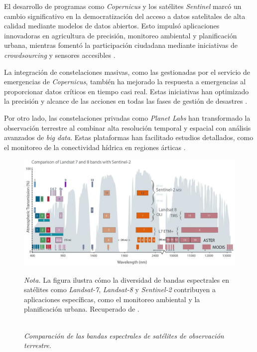         El desarrollo de programas como \textit{Copernicus} y los satélites \textit{Sentinel} marcó un cambio significativo en la democratización del acceso a datos satelitales de alta calidad mediante modelos de datos abiertos. Esto impulsó aplicaciones innovadoras en agricultura de precisión, monitoreo ambiental y planificación urbana, mientras fomentó la participación ciudadana mediante iniciativas de \textit{crowdsourcing} y sensores accesibles \autocite{karagiannopoulou2022data}.

        La integración de constelaciones masivas, como las gestionadas por el servicio de emergencias de \textit{Copernicus}, también ha mejorado la respuesta a emergencias al proporcionar datos críticos en tiempo casi real. Estas iniciativas han optimizado la precisión y alcance de las acciones en todas las fases de gestión de desastres \autocite{denis2016evolution}.
    
        Por otro lado, las constelaciones privadas como \textit{Planet Labs} han transformado la observación terrestre al combinar alta resolución temporal y espacial con análisis avanzados de \textit{big data}. Estas plataformas han facilitado estudios detallados, como el monitoreo de la conectividad hídrica en regiones árticas \autocite{cooley2017tracking}.

        \begin{figure}[H] 
            \caption{\doublespacing \\ \textit{Comparación de las bandas espectrales de satélites de observación terrestre.}} 
            \centering
            \includegraphics[width=1\linewidth]{images/comparation.png}
            \begin{justify}
                \textit{Nota.} La figura ilustra cómo la diversidad de bandas espectrales en satélites como \textit{Landsat-7}, \textit{Landsat-8} y \textit{Sentinel-2} contribuyen a aplicaciones específicas, como el monitoreo ambiental y la planificación urbana. Recuperado de \textcite{usgslandsat_2016}.
            \end{justify}                    
            \label{fig:comparison}
        \end{figure}

